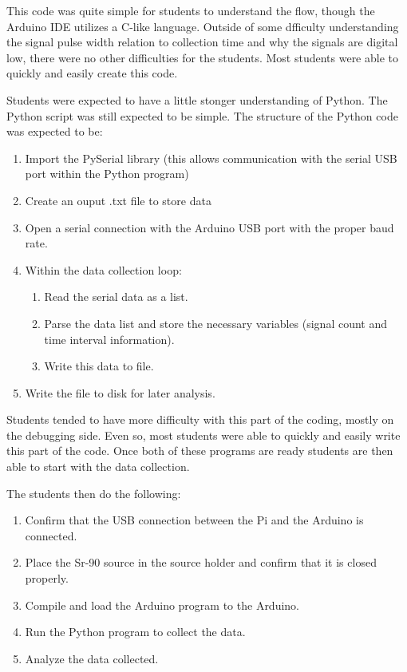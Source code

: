 This code was quite simple for students to understand the flow, though the Arduino IDE utilizes a C-like language.
Outside of some dfficulty understanding the signal pulse width relation to collection time and why the signals are digital low, there were no other difficulties for the students.
Most students were able to quickly and easily create this code.

Students were expected to have a little stonger understanding of Python.
The Python script was still expected to be simple.
The structure of the Python code was expected to be:
\begin{enumerate}
\item Import the PySerial library (this allows communication with the serial USB port within the Python program)
\item Create an ouput .txt file to store data
\item Open a serial connection with the Arduino USB port with the proper baud rate.
\item Within the data collection loop:
  \begin{enumerate}
  \item Read the serial data as a list.
  \item Parse the data list and store the necessary variables (signal count and time interval information).
  \item Write this data to file.
    
  \end{enumerate}
\item Write the file to disk for later analysis.
  
\end{enumerate}

Students tended to have more difficulty with this part of the coding, mostly on the debugging side.
Even so, most students were able to quickly and easily write this part of the code.
Once both of these programs are ready students are then able to start with the data collection.

The students then do the following:
\begin{enumerate}
\item Confirm that the USB connection between the Pi and the Arduino is connected.
\item Place the Sr-90 source in the source holder and confirm that it is closed properly.
\item Compile and load the Arduino program to the Arduino.
\item Run the Python program to collect the data.
\item Analyze the data collected.
  
\end{enumerate}

